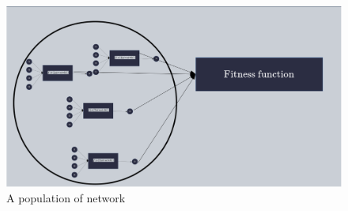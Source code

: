 \documentclass[10pt,a4paper,oneside]{article}
\begin{document}
\begin{figure}[!h]
\centering
\includegraphics[scale=0.35]{./images/population.png}
\caption{A population of network}
\label{pop}
\end{figure}

\vspace{0.8cm}
\end{document}
